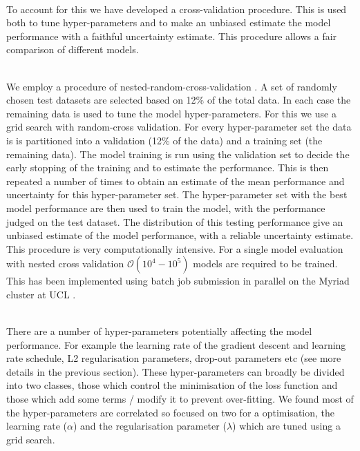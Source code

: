 \documentclass[NOTE, disdraft=true, UKenglish]{\DISCDTLATEXPATH UCLCDTDISdoc}
\begin{document}
\\ \indent To account for this we have developed a cross-validation procedure. This is used both to tune hyper-parameters and to make an unbiased estimate the model performance with a faithful uncertainty estimate. This procedure allows a fair comparison of different models.

\\ \indent We employ a procedure of nested-random-cross-validation \cite{cross_validate}.
A set of randomly chosen test datasets are selected based on 12\% of the total data. In each case the remaining data is used to tune the model hyper-parameters. For this we use a grid search with random-cross validation. For every hyper-parameter set the data is is partitioned into a validation (12\% of the data) and a training set (the remaining data). The model training is run using the validation set to decide the early stopping of the training and to estimate the performance. This is then repeated a number of times to obtain an estimate of the mean performance and uncertainty for this hyper-parameter set. The hyper-parameter set with the best model performance are then used to train the model, with the performance judged on the test dataset. The distribution of this testing performance give an unbiased estimate of the model performance, with a reliable uncertainty estimate. This procedure is very computationally intensive. For a single model evaluation with nested cross validation $\mathcal{O}(10^4-10^5)$ models are required to be trained. This has been implemented using batch job submission in parallel on the Myriad cluster at UCL \cite{myriad}.

\\ \indent There are a number of hyper-parameters potentially affecting the model performance. For example the learning rate of the gradient descent and learning rate schedule, L2 regularisation parameters, drop-out parameters etc (see more details in the previous section). 
These hyper-parameters can broadly be divided into two classes, those which control the minimisation of the loss function and those which add some terms / modify it to prevent over-fitting. We found most of the hyper-parameters are correlated so focused on two for a optimisation, the learning rate ($\alpha$) and the regularisation parameter ($\lambda$) which are tuned using a grid search.  
\end{document}
